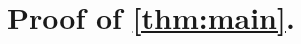 \documentclass[11pt]{article}%
\newtheorem{lemma}[lemma]{Lemma}
\newcommand{\Ncal}[0]{\ensuremath{{\mathcal N}}}
\newcommand{\eR}[0]{\ensuremath{ \mathbb R}}
\newcommand{\norm}[1]{\ensuremath{\left\|#1\right\|}}
\newcommand{\orig}{\underline{0}}
\begin{document}
% 
% 
% 
% 
% 
% 
% 
% 

% 

% 
% 
% 
% 
% 
% 
% 
\section{Proof of \cref{thm:main}.\label{sec:main}}

\vspace{1ex}
\end{document}
